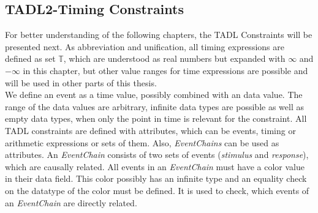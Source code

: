 \subsection{TADL2-Timing Constraints}
	\label{tadl2Constraints}
	For better understanding of the following chapters, the TADL Constraints will be presented next. As abbreviation and unification, all timing expressions are defined as set $\mathbb{T}$, which are understood as real numbers but expanded with $\infty$ and $-\infty$ in this chapter, but other value ranges for time expressions are possible and will be used in other parts of this thesis.\\
	We define an event as a time value, possibly combined with an data value. The range of the data values are arbitrary, infinite data types are possible as well as empty data types, when only the point in time is relevant for the constraint. All TADL constraints are defined with attributes, which can be events, timing or arithmetic expressions or sets of them. Also, \emph{EventChains} can be used as attributes. An \emph{EventChain} consists of two sets of events (\emph{stimulus} and \emph{response}),  which are causally related. All events in an \emph{EventChain} must have a color value in their data field. This color possibly has an infinite type and an equality check on the datatype of the color must be defined. It is used to check, which events of an \emph{EventChain} are directly related.
